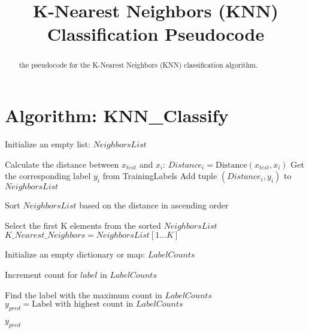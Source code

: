 \documentclass{article}
\title{K-Nearest Neighbors (KNN) Classification Pseudocode}
\author{}
\date{}
\begin{document}
\maketitle

\begin{abstract}
the pseudocode for the K-Nearest Neighbors (KNN) classification algorithm.
\end{abstract}

\section{Algorithm: KNN\_Classify}

\begin{algorithmic}[1]

  \State Initialize an empty list: $NeighborsList$

    \State Calculate the distance between $x_{test}$ and $x_i$:
    \State $Distance_i = \text{Distance}(x_{test}, x_i)$ 
    \State Get the corresponding label $y_i$ from TrainingLabels
    \State Add tuple $(Distance_i, y_i)$ to $NeighborsList$
  \EndFor

  \State Sort $NeighborsList$ based on the distance in ascending order

  \State Select the first K elements from the sorted $NeighborsList$
  \State $K\_Nearest\_Neighbors = NeighborsList[1 \dots K]$ 

  \State Initialize an empty dictionary or map: $LabelCounts$

    \State Increment count for $label$ in $LabelCounts$
  \EndFor

  \State Find the label with the maximum count in $LabelCounts$
  \State $y_{pred} = \text{Label with highest count in } LabelCounts$

  \State \Return $y_{pred}$

\EndProcedure
\end{algorithmic}
\end{document}
